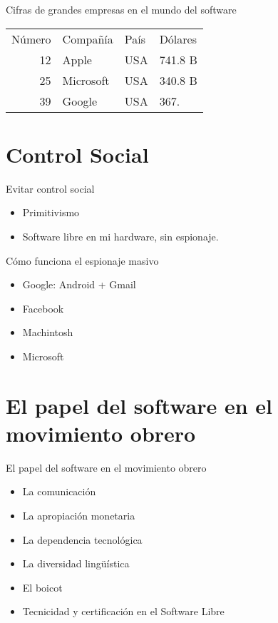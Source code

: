 \documentclass[bigger]{beamer}
\begin{document}
\begin{frame}[label=sec-3-3]{Cifras de grandes empresas en el mundo del software}
\begin{center}
\begin{tabular}{rlll}
Número & Compañía & País & Dólares\\
12 & Apple & USA & 741.8 B\\
25 & Microsoft & USA & 340.8 B\\
39 & Google & USA & 367.\\
\end{tabular}
\end{center}
\end{frame}


\section{Control Social}
\label{sec-4}
\begin{frame}[label=sec-4-1]{Evitar control social}
\begin{itemize}
\item Primitivismo
\item Software libre en mi hardware, sin espionaje.
\end{itemize}
\end{frame}

\begin{frame}[label=sec-4-2]{Cómo funciona el espionaje masivo}
\begin{itemize}
\item Google: Android + Gmail
\item Facebook
\item Machintosh
\item Microsoft
\end{itemize}
\end{frame}

\section{El papel del software en el movimiento obrero}
\label{sec-5}
\begin{frame}[label=sec-5-1]{El papel del software en el movimiento obrero}
\begin{itemize}
\item La comunicación
\item La apropiación monetaria
\item La dependencia tecnológica
\item La diversidad lingüística
\item El boicot
\item Tecnicidad y certificación en el Software Libre
\end{itemize}
\end{frame}
\end{document}

